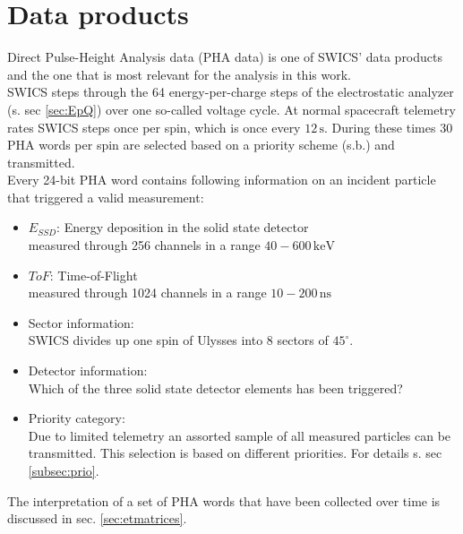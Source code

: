 \section{Data products}
Direct Pulse-Height Analysis data (PHA data) is one of SWICS' data products and the one that is most relevant for the analysis in this work.\\
SWICS steps through the 64 energy-per-charge steps of the electrostatic analyzer (s. sec \ref{sec:EpQ}) over one so-called voltage cycle. At normal spacecraft telemetry rates SWICS steps once per spin, which is once every $12\,\mathrm{s}$. During these times 30 PHA words per spin are selected based on a priority scheme (s.b.) and transmitted.\\
Every 24-bit PHA word contains following information on an incident particle that triggered a valid measurement:
\begin{itemize}
	\item $E_{SSD}$: Energy deposition in the solid state detector \\
	measured through 256 channels in a range $40 - 600\,\mathrm{keV}$
	\item $ToF$: Time-of-Flight\\
	measured through 1024 channels in a range $10 - 200\,\mathrm{ns}$
	\item Sector information:\\
	SWICS divides up one spin of Ulysses into 8 sectors of $45^\circ$.
	\item Detector information: \\
	Which of the three solid state detector elements has been triggered?
	\item Priority category: \\
	Due to limited telemetry an assorted sample of all measured particles can be transmitted. This selection is based on different priorities. For details s. sec \ref{subsec:prio}.
\end{itemize}
The interpretation of a set of PHA words that have been collected over time is discussed in sec. \ref{sec:etmatrices}. 
%

